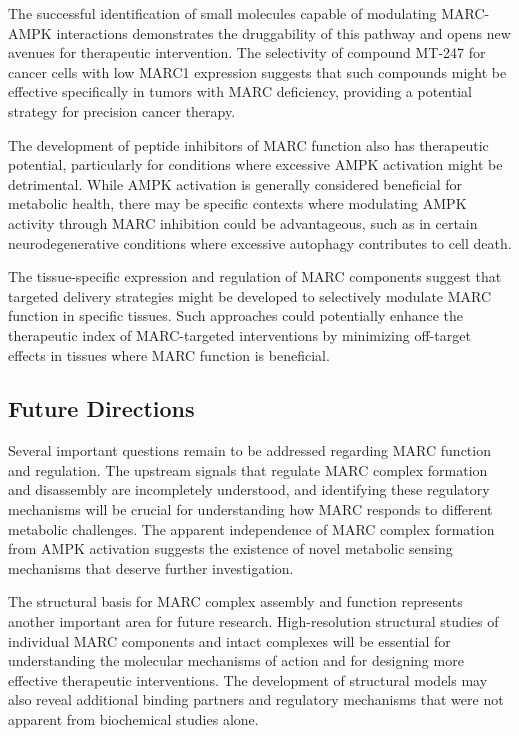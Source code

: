 \documentclass[11pt,a4paper]{article}
\begin{document}
The successful identification of small molecules capable of modulating MARC-AMPK interactions demonstrates the druggability of this pathway and opens new avenues for therapeutic intervention. The selectivity of compound MT-247 for cancer cells with low MARC1 expression suggests that such compounds might be effective specifically in tumors with MARC deficiency, providing a potential strategy for precision cancer therapy.

The development of peptide inhibitors of MARC function also has therapeutic potential, particularly for conditions where excessive AMPK activation might be detrimental. While AMPK activation is generally considered beneficial for metabolic health, there may be specific contexts where modulating AMPK activity through MARC inhibition could be advantageous, such as in certain neurodegenerative conditions where excessive autophagy contributes to cell death.

The tissue-specific expression and regulation of MARC components suggest that targeted delivery strategies might be developed to selectively modulate MARC function in specific tissues. Such approaches could potentially enhance the therapeutic index of MARC-targeted interventions by minimizing off-target effects in tissues where MARC function is beneficial.

\subsection{Future Directions}

Several important questions remain to be addressed regarding MARC function and regulation. The upstream signals that regulate MARC complex formation and disassembly are incompletely understood, and identifying these regulatory mechanisms will be crucial for understanding how MARC responds to different metabolic challenges. The apparent independence of MARC complex formation from AMPK activation suggests the existence of novel metabolic sensing mechanisms that deserve further investigation.

The structural basis for MARC complex assembly and function represents another important area for future research. High-resolution structural studies of individual MARC components and intact complexes will be essential for understanding the molecular mechanisms of action and for designing more effective therapeutic interventions. The development of structural models may also reveal additional binding partners and regulatory mechanisms that were not apparent from biochemical studies alone.
\end{document}
